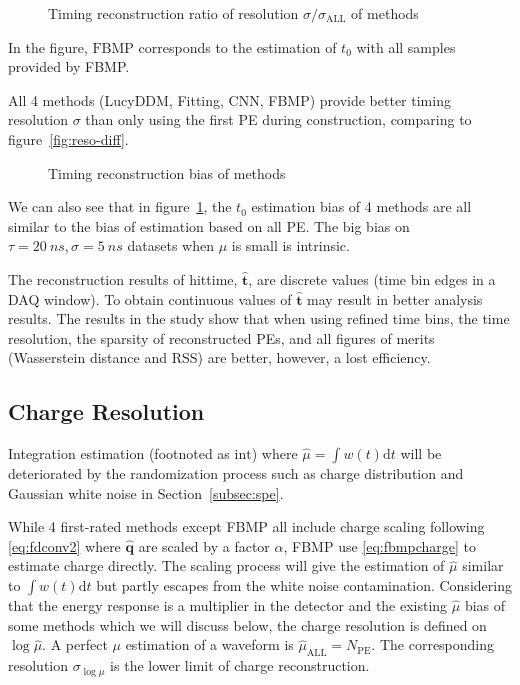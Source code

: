 \begin{figure}[H]
    \centering
    \resizebox{\textwidth}{!}{}
    \caption{\label{fig:deltamethods} Timing reconstruction ratio of resolution $\sigma/\sigma_{\mathrm{ALL}}$ of methods}
\end{figure}

In the figure, $\mathrm{FBMP}$ corresponds to the estimation of $t_{0}$ with all samples provided by FBMP. 

All 4 methods (LucyDDM, Fitting, CNN, FBMP) provide better timing resolution $\sigma$ than only using the first PE during construction, comparing to figure~\ref{fig:reso-diff}. 

\begin{figure}[H]
    \centering
    \resizebox{\textwidth}{!}{}
    \caption{\label{fig:biasmethods}Timing reconstruction bias of methods}
\end{figure}

We can also see that in figure~\ref{fig:deltamethods}, the $t_0$ estimation bias of 4 methods are all similar to the bias of estimation based on all PE. The big bias on $\tau=\SI{20}{ns}, \sigma=\SI{5}{ns}$ datasets when $\mu$ is small is intrinsic. 


The reconstruction results of hittime, $\bm{\hat{t}}$, are discrete values (time bin edges in a DAQ window). To obtain continuous values of $\bm{\hat{t}}$ may result in better analysis results. The results in the study show that when using refined time bins, the time resolution, the sparsity of reconstructed PEs, and all figures of merits (Wasserstein distance and RSS) are better, however, a lost efficiency. 

\subsection{Charge Resolution}
\label{subsec:chargereconstruction}

Integration estimation (footnoted as $\mathrm{int}$) where $\hat{\mu}=\int w(t)\mathrm{d}t$ will be deteriorated by the randomization process such as charge distribution and Gaussian white noise in Section~\ref{subsec:spe}. 

While 4 first-rated methods except FBMP all include charge scaling following \eqref{eq:fdconv2} where $\bm{\hat{q}}$ are scaled by a factor $\alpha$, FBMP use \eqref{eq:fbmpcharge} to estimate charge directly. The scaling process will give the estimation of $\hat{\mu}$ similar to $\int w(t)\mathrm{d}t$ but partly escapes from the white noise contamination. Considering that the energy response is a multiplier in the detector and the existing $\hat{\mu}$ bias of some methods which we will discuss below, the charge resolution is defined on $\log{\hat{\mu}}$. A perfect $\mu$ estimation of a waveform is $\hat{\mu}_\mathrm{ALL}=N_\mathrm{PE}$. The corresponding resolution $\sigma_{\log\mu}$ is the lower limit of charge reconstruction. 

